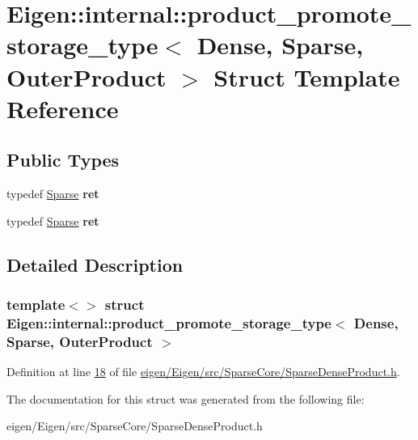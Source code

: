 \hypertarget{struct_eigen_1_1internal_1_1product__promote__storage__type_3_01_dense_00_01_sparse_00_01_outer_product_01_4}{}\section{Eigen\+:\+:internal\+:\+:product\+\_\+promote\+\_\+storage\+\_\+type$<$ Dense, Sparse, Outer\+Product $>$ Struct Template Reference}
\label{struct_eigen_1_1internal_1_1product__promote__storage__type_3_01_dense_00_01_sparse_00_01_outer_product_01_4}
\subsection*{Public Types}
\begin{DoxyCompactItemize}
\item 
\mbox{\label{struct_eigen_1_1internal_1_1product__promote__storage__type_3_01_dense_00_01_sparse_00_01_outer_product_01_4_ab4ca8caac8509b62ab8cd0ddacd1fc44}} 
typedef \hyperlink{struct_eigen_1_1_sparse}{Sparse} {\bfseries ret}
\item 
\mbox{\label{struct_eigen_1_1internal_1_1product__promote__storage__type_3_01_dense_00_01_sparse_00_01_outer_product_01_4_ab4ca8caac8509b62ab8cd0ddacd1fc44}} 
typedef \hyperlink{struct_eigen_1_1_sparse}{Sparse} {\bfseries ret}
\end{DoxyCompactItemize}


\subsection{Detailed Description}
\subsubsection*{template$<$$>$\newline
struct Eigen\+::internal\+::product\+\_\+promote\+\_\+storage\+\_\+type$<$ Dense, Sparse, Outer\+Product $>$}



Definition at line \hyperlink{eigen_2_eigen_2src_2_sparse_core_2_sparse_dense_product_8h_source_l00018}{18} of file \hyperlink{eigen_2_eigen_2src_2_sparse_core_2_sparse_dense_product_8h_source}{eigen/\+Eigen/src/\+Sparse\+Core/\+Sparse\+Dense\+Product.\+h}.



The documentation for this struct was generated from the following file\+:\begin{DoxyCompactItemize}
\item 
eigen/\+Eigen/src/\+Sparse\+Core/\+Sparse\+Dense\+Product.\+h\end{DoxyCompactItemize}
